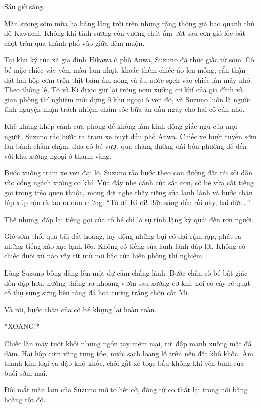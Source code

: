 \documentclass[../main.tex]{subfiles}
\begin{document}
Sáu giờ sáng.

Màn sương sớm mùa hạ bảng lảng trôi trên những rặng thông già bao quanh thủ đô Kawachi. Không khí tinh sương còn vương chút ẩm ướt sau cơn gió lốc bất chợt tràn qua thành phố vào giữa đêm muộn.

Tại khu ký túc xá gia đình Hikawa ở phố Anwa, Suzuno đã thức giấc từ sớm. Cô bé mặc chiếc váy yếm màu lam nhạt, khoác thêm chiếc áo len mỏng, cẩn thận đặt hai hộp cơm trộn thịt băm ấm nóng và âu nước sạch vào chiếc làn mây nhỏ. Theo thông lệ, Tô và Ki được giữ lại trông nom xưởng cơ khí của gia đình và gian phòng thí nghiệm mới dựng ở khu ngoại ô ven đô, và Suzuno luôn là người tình nguyện nhận trách nhiệm chăm sóc bữa ăn đầu ngày cho hai cô cún nhỏ.

Khẽ khàng khép cánh cửa phòng để không làm kinh động giấc ngủ của mọi người, Suzuno rảo bước ra trạm xe buýt đầu phố Anwa. Chiếc xe buýt tuyến sớm lăn bánh chầm chậm, đưa cô bé vượt qua chặng đường dài bốn phường để đến với khu xưởng ngoại ô thanh vắng.

Bước xuống trạm xe ven đại lộ, Suzuno rảo bước theo con đường đất rải sỏi dẫn vào cổng ngách xưởng cơ khí. Vừa đẩy nhẹ cánh cửa sắt con, cô bé vừa cất tiếng gọi trong trẻo quen thuộc, mong đợi nghe thấy tiếng sủa lanh lảnh và bước chân lúp xúp rộn rã lao ra đón mừng: ``Tô ơi! Ki ơi! Bữa sáng đến rồi này, hai đứa\dots''

Thế nhưng, đáp lại tiếng gọi của cô bé chỉ là sự tĩnh lặng kỳ quái đến rợn người.

Gió sớm thổi qua bãi đất hoang, lay động những bụi cỏ dại rậm rạp, phát ra những tiếng xào xạc lạnh lẽo. Không có tiếng sủa lanh lảnh đáp lời. Không có chiếc đuôi xù nào vẫy tít mù nơi bậc cửa hiên phòng thí nghiệm.

Lòng Suzuno bỗng dâng lên một dự cảm chẳng lành. Bước chân cô bé bất giác dồn dập hơn, hướng thẳng ra khoảng vườn sau xưởng cơ khí, nơi có cây rẻ quạt cổ thụ sừng sững bên tảng đá hoa cương trắng chôn cất Mi.

Và rồi, bước chân của cô bé khựng lại hoàn toàn.

*XOẢNG!*

Chiếc làn mây tuột khỏi những ngón tay mềm mại, rơi đập mạnh xuống mặt đá dăm. Hai hộp cơm văng tung tóe, nước sạch loang lổ trên nền đất khô khốc. Âm thanh kim loại va đập khô khốc, chói gắt xé toạc bầu không khí yên bình của buổi sớm mai.

Đôi mắt màu lam của Suzuno mở to hết cỡ, đồng tử co thắt lại trong nỗi bàng hoàng tột độ.
\end{document}
